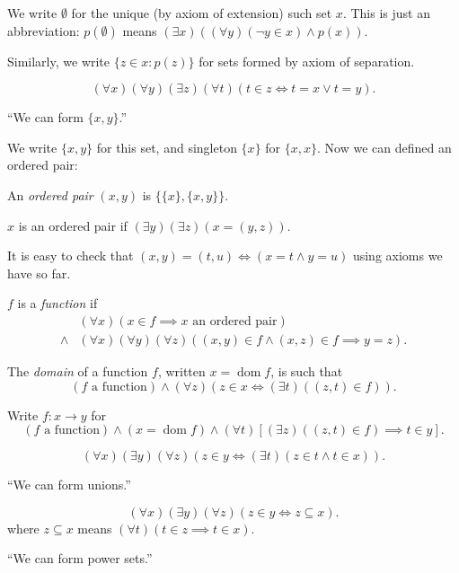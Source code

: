 \documentclass[a4paper]{article}
\DeclareMathOperator{\dom}{dom} %
\begin{document}
We write \(\emptyset\) for the unique (by axiom of extension) such set \(x\). This is just an abbreviation: \(p(\emptyset)\) means \((\exists x) ((\forall y) (\neg y \in x) \land p(x))\).

Similarly, we write \(\{z \in x: p(z)\}\) for sets formed by axiom of separation.

\begin{axiom*}
  \[
    (\forall x) (\forall y) (\exists z) (\forall t) (t \in z \iff t = x \lor t = y).
  \]
\end{axiom*}
``We can form \(\{x, y\}\).''

We write \(\{x, y\}\) for this set, and singleton \(\{x\}\) for \(\{x, x\}\). Now we can defined an ordered pair:

\begin{definition}
  An \emph{ordered pair} \((x, y)\) is \(\{\{x\}, \{x, y\}\}\).

  \(x\) is an ordered pair if \((\exists y) (\exists z) (x = (y, z))\).
\end{definition}

It is easy to check that \((x, y) = (t, u) \iff (x = t \land y = u)\) using axioms we have so far.

\begin{definition}[Function]
  \(f\) is a \emph{function} if
  \begin{align*}
    &(\forall x) (x \in f \implies x \text{ an ordered pair}) \\
    \land & (\forall x) (\forall y) (\forall z) ((x, y) \in f \land (x, z) \in f \implies y = z).
  \end{align*}

  The \emph{domain} of a function \(f\), written \(x = \dom f\), is such that
  \[
    (f \text{ a function}) \land (\forall z) (z \in x \iff (\exists t) ((z, t) \in f)).
  \]

  Write \(f: x \to y\) for
  \[
    (f \text{ a function}) \land (x = \dom f) \land (\forall t) [(\exists z) ((z, t) \in f) \implies t \in y].
  \]
\end{definition}

\begin{axiom*}
  \[
    (\forall x) (\exists y) (\forall z) (z \in y \iff (\exists t) (z \in t \land t \in x)).
  \]
\end{axiom*}
``We can form unions.''

\begin{axiom*}
  \[
    (\forall x) (\exists y) (\forall z) (z \in y \iff z \subseteq x).
  \]
  where \(z \subseteq x\) means \((\forall t) (t \in z \implies t \in x)\).
\end{axiom*}
``We can form power sets.''
\end{document}
